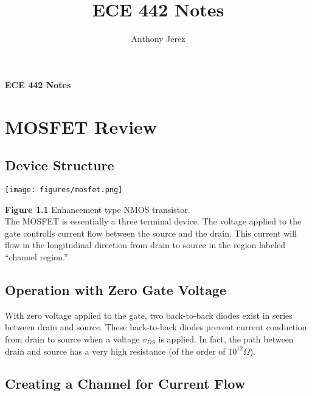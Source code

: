 \documentclass[12pt]{article}
\title{ECE 442 Notes}
\author{Anthony Jerez}
\begin{document}
    \setlength{\parindent}{0pt}

    \begin{center}
        \textbf{ECE 442 Notes}
    \end{center}

    \section{MOSFET Review}

    \subsection*{Device Structure}

    \begin{center}
        \texttt{[image: figures/mosfet.png]}
    \end{center}
    \textbf{Figure 1.1} Enhancement type NMOS transistor.\\
    The MOSFET is essentially a three terminal device. The voltage 
    applied to the gate controlls current flow between the source
    and the drain. This current will flow in the longitudinal 
    direction from drain to source in the region labeled “channel region.”

    \subsection*{Operation with Zero Gate Voltage}

    With zero voltage applied to the gate, two back-to-back diodes exist 
    in series between drain and source. These back-to-back diodes prevent 
    current conduction from drain to source when a voltage $v_{DS}$ is applied. 
    In fact, the path between drain and source has a very high resistance 
    (of the order of $10^{12} \Omega$).

    \subsection*{Creating a Channel for Current Flow}
\end{document}

